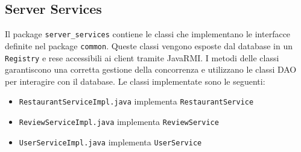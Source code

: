 \subsection{Server Services}
Il package \texttt{server\_services} contiene le classi che implementano
le interfacce definite nel package \texttt{common}.
Queste classi vengono esposte dal database in un \texttt{Registry}
e rese accessibili ai client tramite JavaRMI.
I metodi delle classi garantiscono una corretta gestione della 
concorrenza e utilizzano le classi DAO per interagire con il database.
Le classi implementate sono le seguenti:
\begin{itemize}
    \item \texttt{RestaurantServiceImpl.java} implementa \texttt{RestaurantService}
    \item \texttt{ReviewServiceImpl.java} implementa \texttt{ReviewService}
    \item \texttt{UserServiceImpl.java} implementa \texttt{UserService}
\end{itemize}
